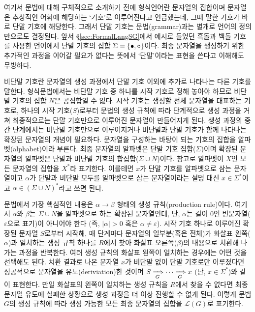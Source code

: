 여기서 문법에 대해 구체적으로 소개하기 전에 형식언어란 문자열의 집합이며
문자열은 추상적인 어휘에 해당하는 `기호'로 이루어진다고 언급했는데,
그때 말한 기호가 바로 단말 기호에 해당한다.
그래서 단말 기호는 문법(grammar)과는 별개로 언어의 정의만으로도 결정된다.
앞서 \S\ref{sec:FormalLangSG}에서 예시로 들었던 흑돌과 백돌 기호를 사용한
언어에서 단말 기호의 집합 $\Sigma = \{\bullet, \circ\}$이다.
최종 문자열을 생성하기 위한 추가적인 과정을 이어갈 필요가 없다는 뜻에서
`단말'이라는 표현을 쓴다고 이해해도 무방하다.

비단말 기호란 문자열의 생성 과정에서 단말 기호 이외에 추가로 나타나는
다른 기호를 말한다. 형식문법에서는 비단말 기호 중 하나를 시작 기호로
정해 놓아야 하므로 비단말 기호의 집합 $N$은 공집합일 수 없다. 시작 기호는
생성할 전체 문자열을 대표하는 기호로, 하나의 시작 기호($S$)로부터 문법의
생성 규칙에 따라 단계적으로 생성 과정을 거쳐 최종적으로는 단말 기호만으로
이루어진 문자열이 만들어지게 된다. 생성 과정의 중간 단계에서는 비단말 기호만으로
이루어지거나 비단말과 단말 기호가 함께 나타나는 확장된 문자열의 개념이 필요하다.
문자열을 구성하는 바탕이 되는 기호의 집합을 알파벳(alphabet)이라 부른다.
최종 문자열의 알파벳은 단말 기호 집합($\Sigma$)이며 확장된 문자열의 알파벳은
단말과 비단말 기호의 합집합($\Sigma\cup N$)이다. 참고로 알파벳이 $X$인
모든 문자열의 집합을 $X^{*}$라 표기한다. 이를테면
$x$가 단말 기호를 알파벳으로 삼는 문자열이고
$\alpha$가 단말과 비단말 모두를 알파벳으로 삼는 문자열이라는
설명 대신 $x\in\Sigma^{*}$이고 $\alpha\in(\Sigma\cup N)^{*}$라고 쓰면 된다.

문법에서 가장 핵심적인 내용은 $\alpha\to\beta$ 형태의 생성 규칙(production rule)이다.
여기서 $\alpha$와 $\beta$는  $\Sigma\cup N$을 알파벳으로 하는 확장된 문자열인데,
단, $\alpha$는 길이 0인 빈문자열($\varepsilon$으로 표기)이 아니어야 한다
(즉, $\lvert\alpha\rvert>0$ 혹은 $\alpha\neq\varepsilon$).
시작 기호 하나로 이루어진 확장된 문자열 $S$로부터 시작해, 매 단계마다
문자열의 일부분(혹은 전체)가 화살표 왼쪽($\alpha$)과 일치하는 생성 규칙
하나를 $R$에서 찾아 화살표 오른쪽($\beta$)의 내용으로 치환해 나가는 과정을
반복한다. 여러 생성 규칙의 화살표 왼쪽이 일치하는 경우에는 어떤 것을 선택해도 된다.
치환 결과로 나온 문자열 $x$가 비단말 없이 단말 기호로만 이루졌다면
성공적으로 문자열을 유도(deriviation)한 것이며
$S\xRightarrow[\,G]{} \cdots \xRightarrow[\,G]{} x$ (단, $x\in\Sigma^{*}$)와 같이 표현한다.
만일 화살표의 왼쪽이 일치하는 생성 규칙을 $R$에서 찾을 수 없다면
최종 문자열 유도에 실패한 상황으로 생성 과정을 더 이상 진행할 수 없게 된다.
이렇게 문법 $G$의 생성 규칙에 따라 생성 가능한 모든 최종 문자열의 집합을
$\mathcal{L}(G)$로 표기한다.

